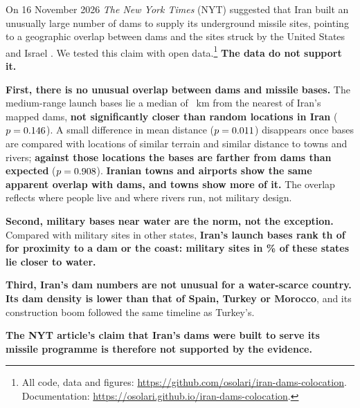\documentclass[numbered]{saim-blog}
\begin{document}
\maketitle

\begin{tldr}[Abstract]
\setlength{\parskip}{0.55em}
On 16 November 2026 \emph{The New York Times} (NYT) suggested that Iran built an unusually large number of dams to supply its underground missile sites, pointing to a geographic overlap between dams and the sites struck by the United States and Israel \citep{nyt2026dams}. We tested this claim with open data.\footnote{All code, data and figures: \url{https://github.com/osolari/iran-dams-colocation}. Documentation: \url{https://osolari.github.io/iran-dams-colocation}.} \textbf{The data do not support it.}

\textbf{First, there is no unusual overlap between dams and missile bases.} The \NBases{} medium-range launch bases lie a median of \ObsMedian{}~km from the nearest of Iran's \NDams{} mapped dams, \textbf{not significantly closer than random locations in Iran} ($p=0.146$). A small difference in mean distance ($p=0.011$) disappears once bases are compared with locations of similar terrain and similar distance to towns and rivers; \textbf{against those locations the bases are farther from dams than expected} ($p=0.908$). \textbf{Iranian towns and airports show the same apparent overlap with dams, and towns show more of it.} The overlap reflects where people live and where rivers run, not military design.

\textbf{Second, military bases near water are the norm, not the exception.} Compared with military sites in \GCountries{} other states, \textbf{Iran's launch bases rank \RankWater{}th of \RankOf{} for proximity to a dam or the coast: military sites in \ShareCloser\% of these states lie closer to water.}

\textbf{Third, Iran's dam numbers are not unusual for a water-scarce country.} \textbf{Its dam density is lower than that of Spain, Turkey or Morocco}, and its construction boom followed the same timeline as Turkey's.

\textbf{The NYT article's claim that Iran's dams were built to serve its missile programme is therefore not supported by the evidence.}
\end{tldr}
\end{document}
